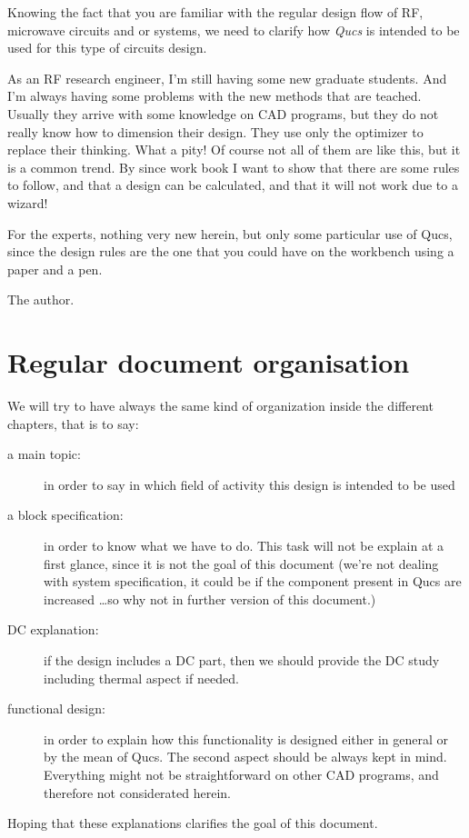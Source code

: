 %
%
%
%


Knowing the fact that you are familiar with the regular design flow of
RF, microwave circuits and or systems, we need to clarify how
\textit{Qucs} is intended to be used for this type of circuits design.
 
\bigskip

As an RF research engineer, I'm still having some new graduate
students.  And I'm always having some problems with the new methods
that are teached.  Usually they arrive with some knowledge on CAD
programs, but they do not really know how to dimension their design.
They use only the optimizer to replace their thinking.  What a pity!
Of course not all of them are like this, but it is a common trend.  By
since work book I want to show that there are some rules to follow,
and that a design can be calculated, and that it will not work due to
a wizard!

\bigskip

For the experts, nothing very new herein, but only some particular use
of Qucs, since the design rules are the one that you could have on the
workbench using a paper and a pen.

\bigskip

The author.

\section*{Regular document organisation}

We will try to have always the same kind of organization inside the
different chapters, that is to say:

\begin{description}
\item[a main topic: ] in order to say in which field of activity this design is intended to be used

\item[a block specification: ] in order to know what we have to do.  This task will not be explain at a first glance, since it is not the goal of this document (we're not dealing with system specification, it could be if the component present in Qucs are increased \ldots so why not in further version of this document.)

\item[DC explanation: ] if the design includes a DC part, then we should provide the DC study including thermal aspect if needed.

\item[functional design: ] in order to explain how this functionality is designed either in general or by the mean of Qucs.  The second aspect should be always kept in mind.  Everything might not be straightforward on other CAD programs, and therefore not considerated herein.

\end{description}

\bigskip

Hoping that these explanations clarifies the goal of this document.
